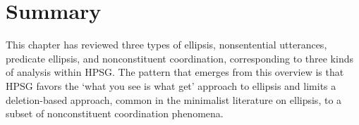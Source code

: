 {%
 
%
%
%
%
%

%
%
%
%
%
%
%
%
%
%
%
%
%





\section{Summary}
\label{sum}
This chapter has reviewed three types of ellipsis, nonsentential utterances, predicate ellipsis, and nonconstituent coordination, corresponding to three kinds of analysis within HPSG. The pattern that emerges from this overview is that HPSG favors the `what you see is what get' approach to ellipsis and limits a deletion-based approach, common in the minimalist literature on ellipsis, to a subset of nonconstituent coordination phenomena.









}
